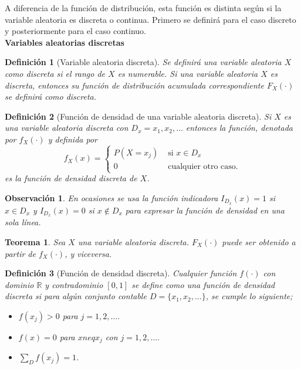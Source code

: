 \documentclass[12pt]{article}
\newtheorem{theorem}{Teorema}[section]
\newtheorem*{remark}{Observación}
\newtheorem{definition}{Definición}
\begin{document}
A diferencia de la función de distribución, esta función es distinta según si la variable aleatoria es discreta o continua. Primero se definirá para el caso discreto y posteriormente para el caso continuo.\\

\textbf{Variables aleatorias discretas}  
\begin{definition}[Variable aleatoria discreta]
Se definirá una variable aleatoria $X$ como discreta si el rango de $X$ es numerable. Si una variable aleatoria $X$ es discreta, entonces su función de distribución acumulada correspondiente $F_X(\cdot)$ se definirá como discreta.
\end{definition}

\begin{definition}[Función de densidad de una variable aleatoria discreta]
    Si $X$ es una variable aleatoria discreta con $D_x=x_1,x_2,\ldots$ entonces la función, denotada por $f_X(\cdot)$ y definida por
$$f_X(x)=\begin{cases}
P(X=x_j) & \text{ si } x \in D_x\\
0 & \text{ cualquier otro caso.}  
\end{cases}$$
es la función de densidad discreta de $X$.
\end{definition}

\begin{remark}
    En ocasiones se usa la función indicadora $I_{D_x}(x)=1$ si $x\in D_x$ y $I_{D_x}(x)=0$ si $x\notin D_x$ para expresar la función de densidad en una sola línea.
\end{remark}

\begin{theorem}
    Sea $X$ una variable aleatoria discreta. $F_X(\cdot)$ puede ser obtenido a partir de $f_X(\cdot)$, y viceversa.
\end{theorem}

\begin{definition}[Función de densidad discreta]
    Cualquier función $f(\cdot)$ con dominio $\mathbb R$ y contradominio $[0,1]$ se define como una función de densidad discreta si para algún conjunto contable $D=\{x_1, x_2,\ldots\}$, se cumple lo siguiente;
\begin{itemize}
    \item[(i)] $f(x_j)>0$ para $j=1,2,\ldots.$
    \item[(ii)] $f(x)=0$ para $x neq x_j$ con $j=1,2,\ldots.$ 
    \item[(iii)] $\sum_D f(x_j)=1$.
\end{itemize}
\end{definition}
\end{document}
